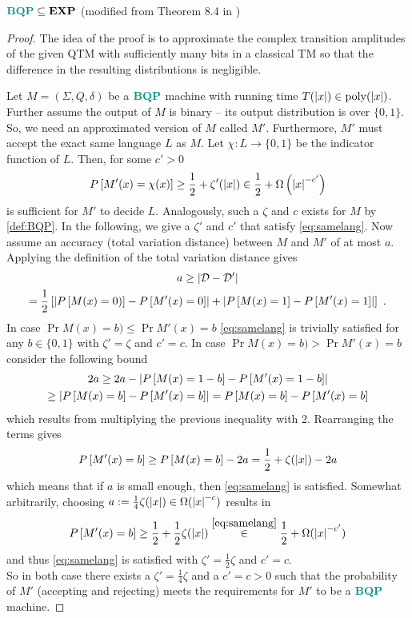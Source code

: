 \begin{theorem}
\label{th:bqpexp}
$\BQP\subseteq\EXP$ (modified from Theorem 8.4 in \cite{bernstein_vazirani_1997})

\begin{proof}
The idea of the proof is to approximate the complex transition amplitudes of the given \ac{QTM} with sufficiently many bits in a classical \ac{TM} so that the difference in the resulting distributions is negligible.

Let $M=(\Sigma, Q, \delta)$ be a $\BQP$ machine with running time $T(\left\vert x\right\vert)\in\mathrm{poly}(\left\vert x\right\vert)$.
Further assume the output of $M$ is binary -- its output distribution is over $\{0,1\}$.
So, we need an approximated version of $M$ called $M'$.
Furthermore, $M'$ must accept the exact same language $L$ as $M$.
Let $\chi:L\to\{0,1\}$ be the indicator function of $L$.
Then, for some $c'>0$
\begin{equation}
\label{eq:samelang}
    P\left[M'(x)=\chi(x)\right]
    \geq\frac{1}{2}+\zeta'(\left\vert x\right\vert)
    \in\frac{1}{2}+\Omega\left(\left\vert x\right\vert^{-c'}\right)
\end{equation}
is sufficient for $M'$ to decide $L$.
Analogously, such a $\zeta$ and $c$ exists for $M$ by \cref{def:BQP}.
In the following, we give a $\zeta'$ and $c'$ that satisfy \cref{eq:samelang}.
Now assume an accuracy (total variation distance) between $M$ and $M'$ of at most $a$.
Applying the definition of the total variation distance gives
\begin{multline}
    a
    \geq\left\vert\mathcal{D}-\mathcal{D}'\right\vert
    \\
    =\frac{1}{2}\left[\left\vert P\left[M(x)=0)\right]-P\left[M'(x)=0\right]\right\vert+\left\vert P\left[M(x)=1\right]-P\left[M'(x)=1\right]\right\vert\right]
    \ .
\end{multline}
In case $\Pr{M(x)=b)}\leq\Pr{M'(x)=b}$ \cref{eq:samelang} is trivially satisfied for any $b\in\{0,1\}$ with $\zeta'=\zeta$ and $c'=c$.
In case $\Pr{M(x)=b)}>\Pr{M'(x)=b}$ consider the following bound
\begin{multline}
    2a
    \geq 2a-\left\vert P\left[M(x)=1-b\right]-P\left[M'(x)=1-b\right]\right\vert
    \\
    \geq\left\vert P\left[M(x)=b\right]-P\left[M'(x)=b\right]\right\vert
    =P\left[M(x)=b\right]-P\left[M'(x)=b\right]
\end{multline}
which results from multiplying the previous inequality with $2$.
Rearranging the terms gives
\begin{equation}
    P\left[M'(x)=b\right]
    \geq P\left[M(x)=b\right]-2a
    =\frac{1}{2}+\zeta(\left\vert x\right\vert)-2a
\end{equation}
which means that if $a$ is small enough, then \cref{eq:samelang} is satisfied.
Somewhat arbitrarily, choosing $a:=\frac{1}{4}\zeta(\left\vert x\right\vert)\in\Omega(\left\vert x\right\vert^{-c})$ results in
\begin{equation}
    P\left[M'(x)=b\right]
    \geq\frac{1}{2}+\frac{1}{2}\zeta(\left\vert x\right\vert)
    \overset{\eqref{eq:samelang}}{\in}\frac{1}{2}+\Omega(\left\vert x\right\vert^{-c'})
\end{equation}
and thus \cref{eq:samelang} is satisfied with $\zeta'=\frac{1}{2}\zeta$ and $c'=c$.
\\
So in both case there exists a $\zeta'=\frac{1}{4}\zeta$ and a $c'=c>0$ such that the probability of $M'$ (accepting and rejecting) meets the requirements for $M'$ to be a $\BQP$ machine.


\end{proof}
\end{theorem}
